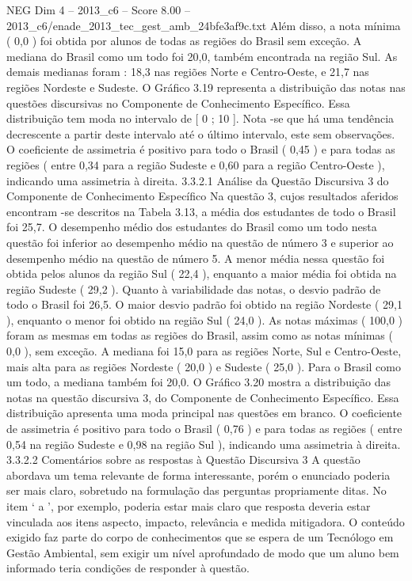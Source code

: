 \begin{textsample}{NEG Dim 4 – 2013\_c6 – Score 8.00 – 2013\_c6/enade\_2013\_tec\_gest\_amb\_24bfe3af9c.txt}
Além disso, a nota mínima ( 0,0 ) foi obtida por alunos de todas as regiões do Brasil sem exceção.
A mediana do Brasil como um todo foi 20,0, também encontrada na região Sul.
As demais medianas foram : 18,3 nas regiões Norte e Centro-Oeste, e 21,7 nas regiões Nordeste e Sudeste.
O Gráfico 3.19 representa a distribuição das notas nas questões discursivas no Componente de Conhecimento Específico.
Essa distribuição tem moda no intervalo de [ 0 ; 10 ].
Nota -se que há uma tendência decrescente a partir deste intervalo até o último intervalo, este sem observações.
O coeficiente de assimetria é positivo para todo o Brasil ( 0,45 ) e para todas as regiões ( entre 0,34 para a região Sudeste e 0,60 para a região Centro-Oeste ), indicando uma assimetria à direita. 3.3.2.1 Análise da Questão Discursiva 3 do Componente de Conhecimento Específico Na questão 3, cujos resultados aferidos encontram -se descritos na Tabela 3.13, a média dos estudantes de todo o Brasil foi 25,7.
O desempenho médio dos estudantes do Brasil como um todo nesta questão foi inferior ao desempenho médio na questão de número 3 e superior ao desempenho médio na questão de número 5.
A menor média nessa questão foi obtida pelos alunos da região Sul ( 22,4 ), enquanto a maior média foi obtida na região Sudeste ( 29,2 ).
Quanto à variabilidade das notas, o desvio padrão de todo o Brasil foi 26,5.
O maior desvio padrão foi obtido na região Nordeste ( 29,1 ), enquanto o menor foi obtido na região Sul ( 24,0 ).
As notas máximas ( 100,0 ) foram as mesmas em todas as regiões do Brasil, assim como as notas mínimas ( 0,0 ), sem exceção.
A mediana foi 15,0 para as regiões Norte, Sul e Centro-Oeste, mais alta para as regiões Nordeste ( 20,0 ) e Sudeste ( 25,0 ).
Para o Brasil como um todo, a mediana também foi 20,0.
O Gráfico 3.20 mostra a distribuição das notas na questão discursiva 3, do Componente de Conhecimento Específico.
Essa distribuição apresenta uma moda principal nas questões em branco.
O coeficiente de assimetria é positivo para todo o Brasil ( 0,76 ) e para todas as regiões ( entre 0,54 na região Sudeste e 0,98 na região Sul ), indicando uma assimetria à direita. 3.3.2.2 Comentários sobre as respostas à Questão Discursiva 3 A questão abordava um tema relevante de forma interessante, porém o enunciado poderia ser mais claro, sobretudo na formulação das perguntas propriamente ditas.
No item ‘ a ’, por exemplo, poderia estar mais claro que resposta deveria estar vinculada aos itens aspecto, impacto, relevância e medida mitigadora.
O conteúdo exigido faz parte do corpo de conhecimentos que se espera de um Tecnólogo em Gestão Ambiental, sem exigir um nível aprofundado de modo que um aluno bem informado teria condições de responder à questão.

\end{textsample}
